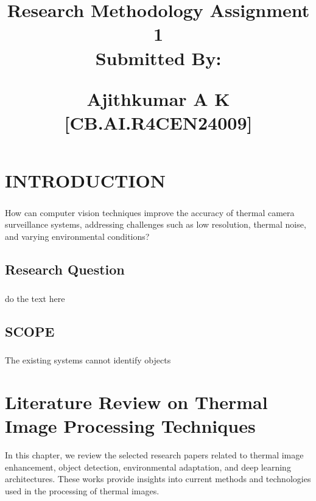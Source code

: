 \documentclass[11pt,a4paper]{report}
\title{
\vspace{-3.4cm}
\begin{center}
{\Large \textbf{Research Methodology Assignment 1}}\\
\vspace{0.5cm}
Submitted By:\\
\vspace{0.2cm}
\begin{large}
{\textbf{Ajithkumar A K}}\\
\textbf{[CB.AI.R4CEN24009]}\\
\end{large}
\end{center}
}
\begin{document}
\maketitle

\chapter{INTRODUCTION}

\pagestyle{fancy}
\rhead{\thepage}
\chead{}

\cfoot{}
\rfoot{}
\renewcommand{\headrulewidth}{0.4pt}
\renewcommand{\footrulewidth}{0.4pt}

\paragraph{ }How can computer vision techniques improve the accuracy of thermal camera surveillance systems, addressing challenges such as low resolution, thermal noise, and varying environmental conditions?
\section{Research Question}
\paragraph{ } do the text here
\newpage
\section{SCOPE}
\paragraph{ }The existing systems cannot identify objects

\chapter{Literature Review on Thermal Image Processing Techniques}

In this chapter, we review the selected research papers related to thermal image enhancement, object detection, environmental adaptation, and deep learning architectures. These works provide insights into current methods and technologies used in the processing of thermal images.
\end{document}
